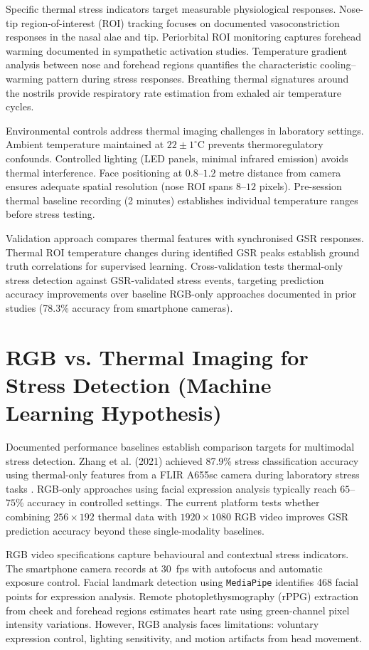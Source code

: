 \documentclass{report}
\begin{document}
Specific thermal stress indicators target measurable physiological responses. Nose-tip region-of-interest (ROI) tracking focuses on documented vasoconstriction responses in the nasal alae and tip. Periorbital ROI monitoring captures forehead warming documented in sympathetic activation studies. Temperature gradient analysis between nose and forehead regions quantifies the characteristic cooling--warming pattern during stress responses. Breathing thermal signatures around the nostrils provide respiratory rate estimation from exhaled air temperature cycles.

Environmental controls address thermal imaging challenges in laboratory settings. Ambient temperature maintained at $22 \pm 1^{\circ}$C prevents thermoregulatory confounds. Controlled lighting (LED panels, minimal infrared emission) avoids thermal interference. Face positioning at $0.8$--$1.2$ metre distance from camera ensures adequate spatial resolution (nose ROI spans $8$--$12$ pixels). Pre-session thermal baseline recording (2 minutes) establishes individual temperature ranges before stress testing.

Validation approach compares thermal features with synchronised GSR responses. Thermal ROI temperature changes during identified GSR peaks establish ground truth correlations for supervised learning. Cross-validation tests thermal-only stress detection against GSR-validated stress events, targeting prediction accuracy improvements over baseline RGB-only approaches documented in prior studies (78.3\% accuracy from smartphone cameras).


\section{RGB vs. Thermal Imaging for Stress Detection (Machine Learning Hypothesis)}
\label{sec:rgb_vs_thermal}

Documented performance baselines establish comparison targets for multimodal stress detection. Zhang et al. (2021) achieved 87.9\% stress classification accuracy using thermal-only features from a FLIR A655sc camera during laboratory stress tasks \cite{zhang2021}. RGB-only approaches using facial expression analysis typically reach $65$--$75$\% accuracy in controlled settings. The current platform tests whether combining $256 \times 192$ thermal data with $1920 \times 1080$ RGB video improves GSR prediction accuracy beyond these single-modality baselines.

RGB video specifications capture behavioural and contextual stress indicators. The smartphone camera records at 30~fps with autofocus and automatic exposure control. Facial landmark detection using \texttt{MediaPipe} identifies 468 facial points for expression analysis. Remote photoplethysmography (rPPG) extraction from cheek and forehead regions estimates heart rate using green-channel pixel intensity variations. However, RGB analysis faces limitations: voluntary expression control, lighting sensitivity, and motion artifacts from head movement.
\end{document}

